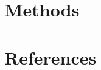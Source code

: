 \documentclass[final,3p,times,authoryear]{elsarticle}
\begin{document}





\section{Methods}\label{sec:Methods}

%
\section{References}\label{ref}
%
 

\end{document}
